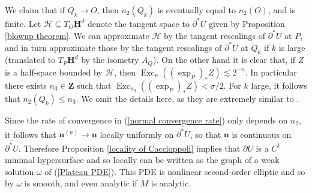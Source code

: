 \documentclass[reqno,12pt,letterpaper]{amsart}
\newcommand{\ZZ}{\mathbf{Z}}
\newcommand{\Hyp}{\mathbf H}
\DeclareMathOperator{\Exc}{Exc}
\newcommand{\Hilb}{\mathcal H}
\newcommand{\normal}{\mathbf n}
\theoremstyle{definition}
\numberwithin{equation}{section}
\begin{document}
We claim that if $Q_k \to O$, then $n_2(Q_k)$ is eventually equal to $n_2(O)$, and is finite.
Let $\Hilb \subseteq T_O\Hyp^d$ denote the tangent space to $\partial^* U$ given by Proposition \ref{blowup theorem}.
We can approximate $\Hilb$ by the tangent rescalings of $\partial^* U$ at $P$, and in turn approximate those by the tangent rescalings of $\partial^* U$ at $Q_k$ if $k$ is large (translated to $T_P \Hyp^d$ by the isometry $A_Q$).
On the other hand it is clear that, if $Z$ is a half-space bounded by $\Hilb$, then $\Exc_n((\exp_P)_* Z) \lesssim 2^{-n}$.
In particular there exists $n_3 \in \ZZ$ such that $\Exc_{n_3}((\exp_P)_* Z) < \sigma/2$.
For $k$ large, it follows that $n_2(Q_k) \leq n_3$.
We omit the details here, as they are extremely similar to \cite[Teorema 4]{Miranda67}.

Since the rate of convergence in (\ref{normal convergence rate}) only depends on $n_2$, it follows that $\normal^{(n)} \to \normal$ locally uniformly on $\overline{\partial^* U}$, so that $\normal$ is continuous on $\overline{\partial^* U}$.
Therefore Proposition \ref{locality of Caccioppoli} implies that $\partial U$ is a $C^1$ minimal hypersurface and so locally can be written as the graph of a weak solution $\omega$ of (\ref{Plateau PDE}).
This PDE is nonlinear second-order elliptic and so by \cite{morrey2009multiple} $\omega$ is smooth, and even analytic if $M$ is analytic.





\printbibliography
\end{document}
